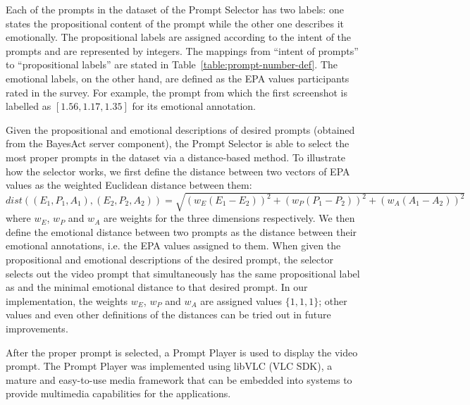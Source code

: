 Each of the prompts in the dataset of the Prompt Selector has two labels: one states the propositional content of the prompt while the other one describes it emotionally. The propositional labels are assigned according to the intent of the prompts and are represented by integers. The mappings from ``intent of prompts'' to ``propositional labels'' are stated in Table~\ref{table:prompt-number-def}. The emotional labels, on the other hand, are defined as the EPA values participants rated in the survey. For example, the prompt from which the first screenshot is labelled as $[1.56, 1.17, 1.35]$ for its emotional annotation.

Given the propositional and emotional descriptions of desired prompts (obtained from the BayesAct server component), the Prompt Selector is able to select the most proper prompts in the dataset via a distance-based method. To illustrate how the selector works, we first define the distance between two vectors of EPA values as the weighted Euclidean distance between them: \\
$dist((E_1, P_1, A_1), (E_2, P_2, A_2))=\sqrt{(w_E(E_1-E_2))^2+(w_P(P_1-P_2))^2+(w_A(A_1-A_2))^2}$ \\where $w_E$, $w_P$ and $w_A$ are weights for the three dimensions respectively. We then define the emotional distance between two prompts as the distance between their emotional annotations, i.e. the EPA values assigned to them. When given the propositional and emotional descriptions of the desired prompt, the selector selects out the video prompt that simultaneously has the same propositional label as and the minimal emotional distance to that desired prompt. In our implementation, the weights $w_E$, $w_P$ and $w_A$ are assigned values $\{1, 1, 1\}$; other values and even other definitions of the distances can be tried out in future improvements.

After the proper prompt is selected, a Prompt Player is used to display the video prompt. The Prompt Player was implemented using libVLC (VLC SDK), a mature and easy-to-use media framework that can be embedded into systems to provide multimedia capabilities for the applications.




